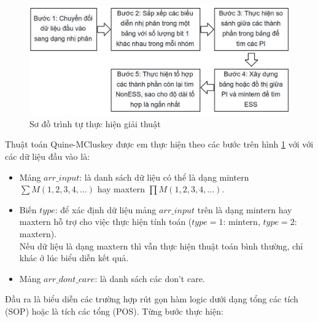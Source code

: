 \documentclass[titlepage]{article} %
\begin{document}
\begin{figure}[H] 
	\centering
	\includegraphics[width=\textwidth]{thuat_toan.png}
	\caption[Sơ đồ trình tự thực hiện giải thuật]{\centering Sơ đồ trình tự thực hiện giải thuật} \label{img:thuat_toan}
\end{figure} \vspace{-0.5cm}
\hspace{0.4cm}Thuật toán Quine-MCluskey \cite{QM:2020} được em thực hiện theo các bước trên hình \ref{img:thuat_toan} với với các dữ liệu đầu vào là: 
\begin{itemize}\vspace{-0.5cm}
 \item Mảng $arr\_input$: là danh sách dữ liệu có thể là dạng mintern $\sum M(1,2,3,4, \dots)$ hay maxtern $\prod M(1,2,3,4, \dots)$.
 \item Biến $type$: để xác định dữ liệu mảng $arr\_input$ trên là dạng mintern hay maxtern hỗ trợ cho việc thực hiện tính toán ($type = 1$: mintern, $type = 2$: maxtern).\\
 Nếu dữ liệu là dạng maxtern thì vẫn thực hiện thuật toán bình thường, chỉ khác ở lúc biểu diễn kết quả.
 \item Mảng $arr\_dont\_care$: là danh sách các don't care.
\end{itemize}
\vspace{0.0cm}
\vspace{-0.5cm}\hspace{0.4cm} Đầu ra là biểu diễn các trường hợp rút gọn hàm logic dưới dạng tổng các tích (SOP) hoặc là tích các tổng (POS).
\newline 
\newline
Từng bước thực hiện:
\end{document}
